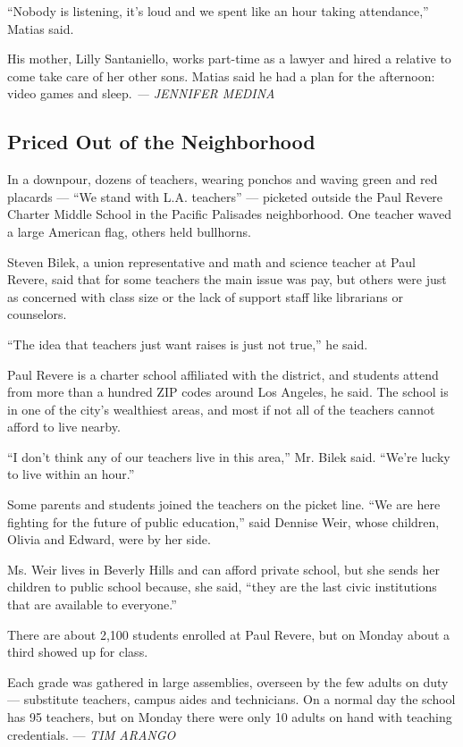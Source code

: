 ``Nobody is listening, it's loud and we spent like an hour taking
attendance,'' Matias said.

His mother, Lilly Santaniello, works part-time as a lawyer and hired a
relative to come take care of her other sons. Matias said he had a plan
for the afternoon: video games and sleep. \emph{--- JENNIFER MEDINA}

\hypertarget{priced-out-of-the-neighborhood}{%
\subsection{Priced Out of the
Neighborhood}\label{priced-out-of-the-neighborhood}}

In a downpour, dozens of teachers, wearing ponchos and waving green and
red placards --- ``We stand with L.A. teachers'' --- picketed outside
the Paul Revere Charter Middle School in the Pacific Palisades
neighborhood. One teacher waved a large American flag, others held
bullhorns.

Steven Bilek, a union representative and math and science teacher at
Paul Revere, said that for some teachers the main issue was pay, but
others were just as concerned with class size or the lack of support
staff like librarians or counselors.

``The idea that teachers just want raises is just not true,'' he said.

Paul Revere is a charter school affiliated with the district, and
students attend from more than a hundred ZIP codes around Los Angeles,
he said. The school is in one of the city's wealthiest areas, and most
if not all of the teachers cannot afford to live nearby.

``I don't think any of our teachers live in this area,'' Mr. Bilek said.
``We're lucky to live within an hour.''

Some parents and students joined the teachers on the picket line. ``We
are here fighting for the future of public education,'' said Dennise
Weir, whose children, Olivia and Edward, were by her side.

Ms. Weir lives in Beverly Hills and can afford private school, but she
sends her children to public school because, she said, ``they are the
last civic institutions that are available to everyone.''

There are about 2,100 students enrolled at Paul Revere, but on Monday
about a third showed up for class.

Each grade was gathered in large assemblies, overseen by the few adults
on duty --- substitute teachers, campus aides and technicians. On a
normal day the school has 95 teachers, but on Monday there were only 10
adults on hand with teaching credentials. --- \emph{TIM ARANGO}

